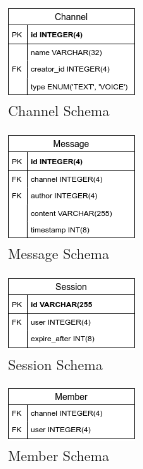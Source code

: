 \begin{figure}[h!]
    \caption{Channel Schema}
    \label{image:channelSchema}
    \centering
    \includegraphics[width=0.3\textwidth]{images/ChannelSchema.png}
\end{figure}

\begin{figure}[h!]
    \caption{Message Schema}
    \label{image:messageSchema}
    \centering
    \includegraphics[width=0.3\textwidth]{images/MessageSchema.png}
\end{figure}

\begin{figure}[h!]
    \caption{Session Schema}
    \label{image:sessionSchema}
    \centering
    \includegraphics[width=0.3\textwidth]{images/SessionSchema.png}
\end{figure}

\begin{figure}[h!]
    \caption{Member Schema}
    \label{image:memberSchema}
    \centering
    \includegraphics[width=0.3\textwidth]{images/MemberSchema.png}
\end{figure}
